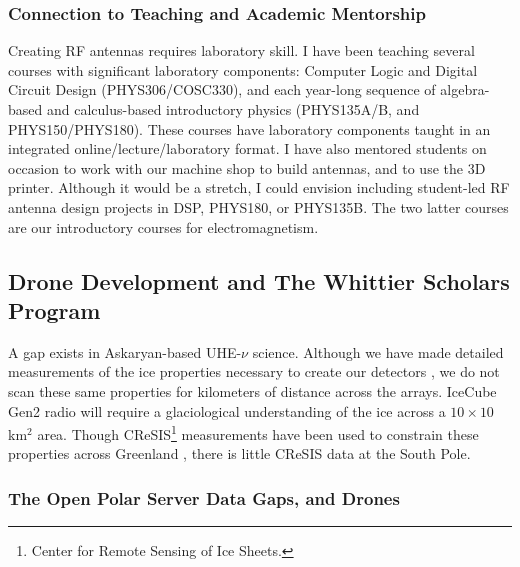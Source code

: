 \documentclass[../../../main.tex]{subfiles}
\begin{document}
\subsubsection{Connection to Teaching and Academic Mentorship}

Creating RF antennas requires laboratory skill.  I have been teaching several courses with significant laboratory components: Computer Logic and Digital Circuit Design (PHYS306/COSC330), and each year-long sequence of algebra-based and calculus-based introductory physics (PHYS135A/B, and PHYS150/PHYS180).  These courses have laboratory components taught in an integrated online/lecture/laboratory format.  I have also mentored students on occasion to work with our machine shop to build antennas, and to use the 3D printer.  Although it would be a stretch, I could envision including student-led RF antenna design projects in DSP, PHYS180, or PHYS135B.  The two latter courses are our introductory courses for electromagnetism.

\subsection{Drone Development and The Whittier Scholars Program}

A gap exists in Askaryan-based UHE-$\nu$ science.  Although we have made detailed measurements of the ice properties necessary to create our detectors \cite{10.3189/2015jog14j214} \cite{10.3189/2015jog15j057} \cite{barwick_besson_gorham_saltzberg_2005}, we do not scan these same properties for kilometers of distance across the arrays.  IceCube Gen2 radio will require a glaciological understanding of the ice across a $10 \times 10$ km$^2$ area.  Though CReSIS\footnote{Center for Remote Sensing of Ice Sheets.} measurements have been used to constrain these properties across Greenland \cite{10.1002/2015rs005849}, there is little CReSIS data at the South Pole.

\subsubsection{The Open Polar Server Data Gaps, and Drones}
\end{document}
